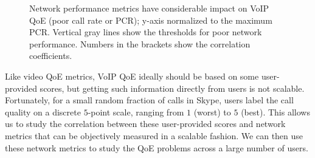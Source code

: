 \newcommand{\hybrid}{\textsc{Via}\xspace}
\newcommand{\Name}{Via\xspace}

\newcommand{\skype}{{Skype}\xspace}
\newcommand{\azure}{{ABC}\xspace}
\newcommand{\direct}{{default}\xspace}
\newcommand{\option}{{relaying option}\xspace}
\newcommand{\options}{{relaying options}\xspace}

\begin{figure}[t!]
\centering
{}
\caption{Network performance metrics have considerable 
impact on VoIP QoE (poor call rate or PCR); 
y-axis normalized to the maximum PCR. Vertical gray lines 
show the thresholds for poor network performance. Numbers in the
brackets show the correlation coefficients.}
\label{fig:pcr}
\end{figure}

Like video QoE metrics, VoIP QoE ideally should be based on some 
user-provided scores, but getting such information directly from users 
is not scalable.
Fortunately, for a small random fraction of calls in \skype, 
users label the call quality on a discrete $5$-point scale, 
ranging from $1$ 
(worst) to $5$ (best). This allows us to study the correlation
between these user-provided scores and network metrics that 
can be objectively measured in a scalable fashion. 
We can then use these network metrics to study the QoE 
problems across a large number of users.

